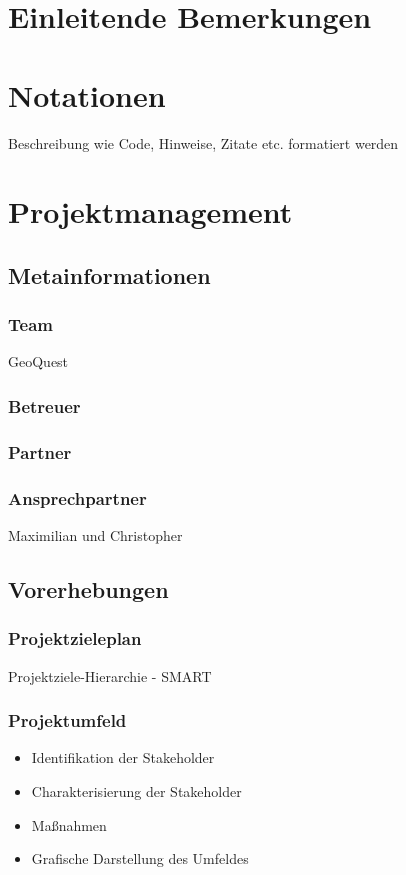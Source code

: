 \def \currentAuthor {Gabi Sorglos} %

\chapter*{Einleitende Bemerkungen}

\chapter*{Notationen}
Beschreibung wie Code, Hinweise, Zitate etc. formatiert werden  

\chapter{Projektmanagement}

\section{Metainformationen}
\subsection{Team}
GeoQuest
\subsection{Betreuer}
\subsection{Partner}
\subsection{Ansprechpartner}
Maximilian und Christopher
\section{Vorerhebungen}
\subsection{Projektzieleplan}
Projektziele-Hierarchie - SMART
\subsection{Projektumfeld}
\begin{itemize}
	\item Identifikation der Stakeholder
	\item Charakterisierung der Stakeholder
	\item Maßnahmen
	\item Grafische Darstellung des Umfeldes
\end{itemize}
